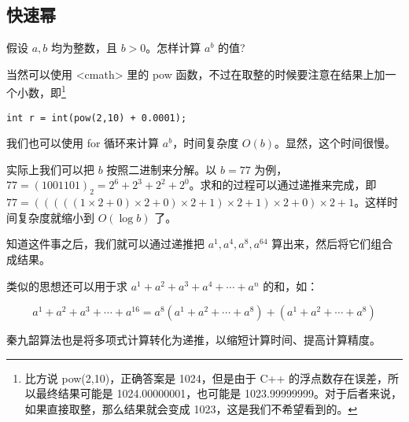 \subsection{快速幂}
	假设 $a,b$ 均为整数，且 $b>0$。怎样计算 $a^{b}$ 的值?
	
	当然可以使用 <cmath> 里的 pow 函数，不过在取整的时候要注意在结果上加一个小数，即\footnote{比方说 pow(2,10)，正确答案是 1024，但是由于 C++ 的浮点数存在误差，所以最终结果可能是 1024.00000001，也可能是 1023.99999999。对于后者来说，如果直接取整，那么结果就会变成 1023，这是我们不希望看到的。}
	
\begin{lstlisting}
int r = int(pow(2,10) + 0.0001);
\end{lstlisting}
	
	我们也可以使用 for 循环来计算 $a^{b}$，时间复杂度 $O(b)$。显然，这个时间很慢。
	
	实际上我们可以把 $b$ 按照二进制来分解。以 $b=77$ 为例，$77=(1001101)_{2}=2^{6}+2^{3}+2^{2}+2^{0}$。求和的过程可以通过递推来完成，即 $77=(((((1\times 2+0)\times 2+0)\times 2+1)\times 2+1)\times 2+0)\times 2+1$。这样时间复杂度就缩小到 $O(\log b)$ 了。
	
	知道这件事之后，我们就可以通过递推把 $a^{1},a^{4},a^{8},a^{{64}}$ 算出来，然后将它们组合成结果。
	
	
	
	类似的思想还可以用于求 $a^{1}+a^{2}+a^{3}+a^{4}+\cdots +a^{n}$ 的和，如：
	
	\[ 
		a^{1}+a^{2}+a^{3}+\cdots +a^{{16}}=a^{8}(a^{1}+a^{2}+\cdots +a^{8})+(a^{1}+a^{2}+\cdots +a^{8})
	\]
	
	秦九韶算法也是将多项式计算转化为递推，以缩短计算时间、提高计算精度。